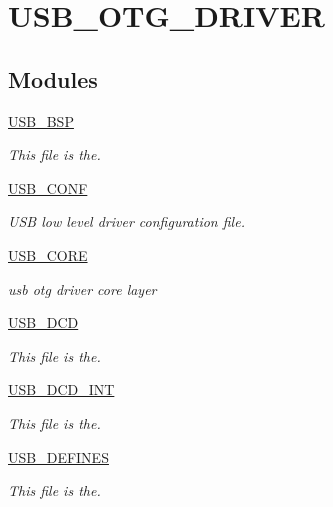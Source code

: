 \hypertarget{group___u_s_b___o_t_g___d_r_i_v_e_r}{\section{U\-S\-B\-\_\-\-O\-T\-G\-\_\-\-D\-R\-I\-V\-E\-R}
\label{group___u_s_b___o_t_g___d_r_i_v_e_r}
}
\subsection*{Modules}
\begin{DoxyCompactItemize}
\item 
\hyperlink{group___u_s_b___b_s_p}{U\-S\-B\-\_\-\-B\-S\-P}
\begin{DoxyCompactList}\small\item\em This file is the. \end{DoxyCompactList}\item 
\hyperlink{group___u_s_b___c_o_n_f}{U\-S\-B\-\_\-\-C\-O\-N\-F}
\begin{DoxyCompactList}\small\item\em U\-S\-B low level driver configuration file. \end{DoxyCompactList}\item 
\hyperlink{group___u_s_b___c_o_r_e}{U\-S\-B\-\_\-\-C\-O\-R\-E}
\begin{DoxyCompactList}\small\item\em usb otg driver core layer \end{DoxyCompactList}\item 
\hyperlink{group___u_s_b___d_c_d}{U\-S\-B\-\_\-\-D\-C\-D}
\begin{DoxyCompactList}\small\item\em This file is the. \end{DoxyCompactList}\item 
\hyperlink{group___u_s_b___d_c_d___i_n_t}{U\-S\-B\-\_\-\-D\-C\-D\-\_\-\-I\-N\-T}
\begin{DoxyCompactList}\small\item\em This file is the. \end{DoxyCompactList}\item 
\hyperlink{group___u_s_b___d_e_f_i_n_e_s}{U\-S\-B\-\_\-\-D\-E\-F\-I\-N\-E\-S}
\begin{DoxyCompactList}\small\item\em This file is the. \end{DoxyCompactList}\item 

\end{DoxyCompactItemize}

